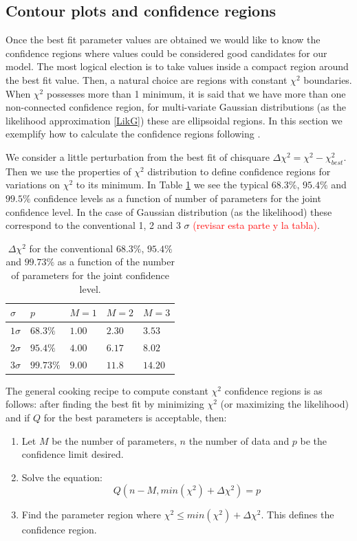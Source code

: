 \documentclass[onecolumn,           %
               showpacs,            %
               preprintnumbers,     %
               aps,                 %
               prl,          	    %
               letterpaper,             %
               superscriptaddress,      %
               nofootinbib,         %
               tightenlines,        %
               floats,floatfix      %
               ,usenatbib,
               ]{revtex4-1}
\begin{document}
\subsection{Contour plots and confidence regions}

Once the best fit parameter values are obtained we would like to know the confidence regions where values could be considered good candidates for our model. The most logical election is to take values inside a compact region around the best fit value. Then, a natural choice are regions with constant $\chi^2$ boundaries. When $\chi^2$ possesses more than 1 minimum, it is said that we have more than one non-connected confidence region, for multi-variate Gaussian distributions (as the likelihood approximation \eqref{LikG}) these are ellipsoidal regions. In this section we exemplify how to calculate the confidence regions following \cite{LiV}. 

We consider a little perturbation from the best fit of chisquare $\Delta\chi^2=\chi^2-\chi^2_{best}$. Then we use the properties of $\chi^2$ distribution to define confidence regions for variations on $\chi^2$ to its minimum. In Table \ref{tableerrors} we see the typical $68.3 \%$, $95.4\%$ and $99.5\%$ confidence levels as a function of number of parameters for the joint confidence level. In the case of Gaussian distribution (as the likelihood) these correspond to the conventional 1, 2 and 3 $\sigma$ \textcolor{red}{(revisar esta parte y la tabla)}.
\begin{table}[h!]
\centering
\begin{tabular}{||l|l|l|l|l||} 
 \hline
$\sigma$ & $p$ & $M=1$ & $M=2$ & $M=3$\\
\hline
$1\sigma$ & $68.3 \%$ & $1.00$ & $2.30$ & $3.53$\\
$2\sigma$ & $95.4 \%$ & $4.00$ & $6.17$ & $8.02$\\
$3\sigma$ & $99.73\%$ & $9.00$ & $11.8$ & $14.20$\\
\hline
\end{tabular}
\caption{\footnotesize{$\Delta \chi^2$ for the conventional $68.3\%$, $95.4\%$ and $99.73\%$ as a function of the number of parameters for the joint confidence level.}}\label{tableerrors}
\end{table}

The general cooking recipe to compute constant $\chi^2$ confidence regions is as follows: after finding the best fit by minimizing $\chi^2$ (or maximizing the likelihood) and if $Q$ for the best parameters is acceptable, then:
\begin{enumerate}
\item Let $M$ be the number of parameters, $n$ the number of data and $p$ be the confidence limit desired.
\item Solve the equation:
\begin{equation}
Q(n-M,min(\chi^2)+\Delta\chi^2)=p
\end{equation}
\item Find the parameter region where $\chi^2\leq min(\chi^2)+\Delta\chi^2$. This defines the confidence region.
\end{enumerate}
\end{document}
